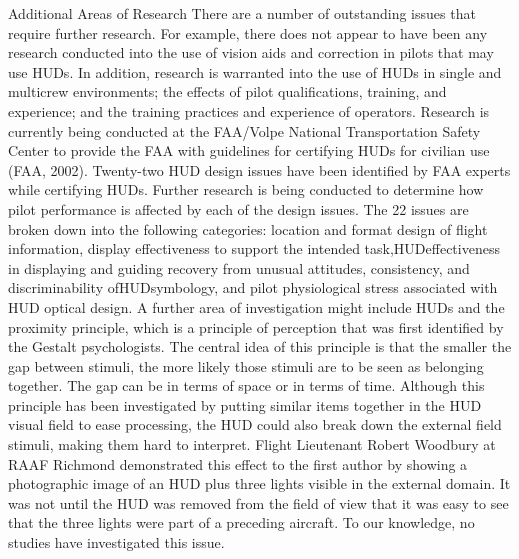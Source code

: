 \documentclass[utf8,bachelor,manualbib]{gradu3}
\begin{document}
Additional Areas of Research
There are a number of outstanding issues that require further research. For example,
there does not appear to have been any research conducted into the use of
vision aids and correction in pilots that may use HUDs. In addition, research is
warranted into the use of HUDs in single and multicrew environments; the effects
of pilot qualifications, training, and experience; and the training practices
and experience of operators.
Research is currently being conducted at the FAA/Volpe National Transportation
Safety Center to provide the FAA with guidelines for certifying HUDs for civilian
use (FAA, 2002). Twenty-two HUD design issues have been identified by
FAA experts while certifying HUDs. Further research is being conducted to determine
how pilot performance is affected by each of the design issues. The 22 issues
are broken down into the following categories: location and format design of flight
information, display effectiveness to support the intended task,HUDeffectiveness
in displaying and guiding recovery from unusual attitudes, consistency, and
discriminability ofHUDsymbology, and pilot physiological stress associated with
HUD optical design.
A further area of investigation might include HUDs and the proximity principle,
which is a principle of perception that was first identified by the Gestalt psychologists.
The central idea of this principle is that the smaller the gap between
stimuli, the more likely those stimuli are to be seen as belonging together. The gap
can be in terms of space or in terms of time. Although this principle has been investigated
by putting similar items together in the HUD visual field to ease processing,
the HUD could also break down the external field stimuli, making them hard
to interpret. Flight Lieutenant Robert Woodbury at RAAF Richmond demonstrated
this effect to the first author by showing a photographic image of an HUD
plus three lights visible in the external domain. It was not until the HUD was removed from the field of view that it was easy to see that the three lights were part of
a preceding aircraft. To our knowledge, no studies have investigated this issue. \citep{crawford2006}
\end{document}
